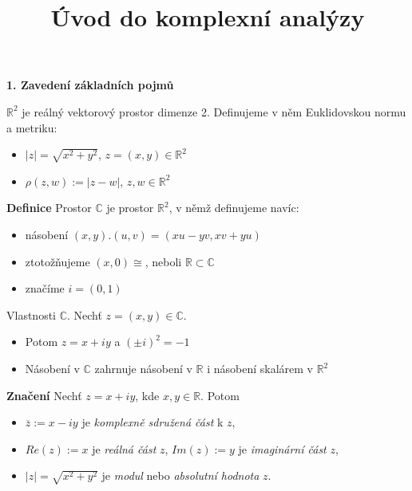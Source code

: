 \documentclass[11pt, a4paper, onecolumn]{article}
\title{\textbf{\Huge Úvod do komplexní analýzy}}
\date{}
\author{\vspace{-10mm}}
\begin{document}
\pagestyle{empty}

\large
\maketitle
\setlength{\parindent}{0in}

\textbf{\Large{1. Zavedení základních pojmů}}
\vspace{5mm}
\large


\textbf{$\mathbb{R}^2$} je reálný vektorový prostor dimenze 2. Definujeme v něm Euklidovskou normu a metriku:
\begin{itemize}
    \item $|z| = \sqrt{x^2+y^2}$, $z = (x,y)\in\mathbb{R}^2$
    \item $\rho(z,w):= |z-w|$, $z,w\in\mathbb{R}^2$
\end{itemize}

\textbf{Definice} Prostor $\mathbb{C}$ je prostor $\mathbb{R}^2$, v němž definujeme navíc:
\begin{itemize}
    \item násobení $(x,y).(u,v) = (xu-yv, xv+yu)$
    \item ztotožňujeme $(x,0) \cong$, neboli $\mathbb{R}\subset\mathbb{C}$
    \item značíme $i = (0,1)$
\end{itemize}

Vlastnosti $\mathbb{C}$. Nechť $z = (x,y)\in\mathbb{C}$.
\begin{itemize}
    \item Potom $z = x+iy$ a $(\pm i)^2 = -1$
    \item Násobení v $\mathbb{C}$ zahrnuje násobení v $\mathbb{R}$ i násobení skalárem v $\mathbb{R}^2$
\end{itemize}


\textbf{Značení} Nechť $z = x+iy$, kde $x,y\in\mathbb{R}$. Potom
\begin{itemize}
    \item $\overline{z}:= x-iy$ je \textit{komplexně sdružená část} k $z$,
    \item $Re(z):= x$ je \textit{reálná část} $z$, $Im(z):= y$ je \textit{imaginární část} $z$,
    \item $|z| = \sqrt{x^2+y^2}$ je \textit{modul} nebo \textit{absolutní hodnota} $z$.
\end{itemize}
\end{document}
